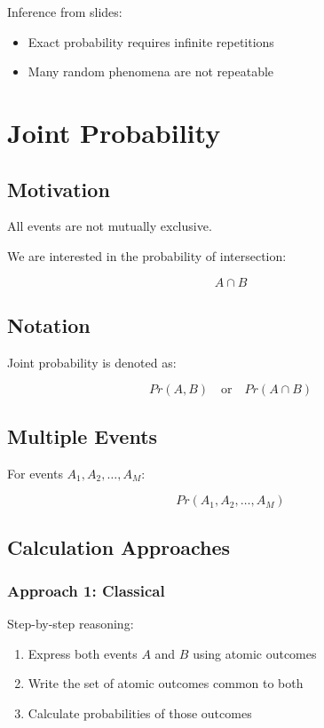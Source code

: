 \documentclass[12pt]{article}
\begin{document}
Inference from slides:

\begin{itemize}
    \item Exact probability requires infinite repetitions
    \item Many random phenomena are not repeatable
\end{itemize}

\section{Joint Probability}

\subsection{Motivation}

All events are not mutually exclusive.

We are interested in the probability of intersection:

\[
A \cap B
\]

\subsection{Notation}

Joint probability is denoted as:

\[
Pr(A,B) \quad \text{or} \quad Pr(A \cap B)
\]

\subsection{Multiple Events}

For events $A_1, A_2, \dots, A_M$:

\[
Pr(A_1, A_2, \dots, A_M)
\]

\subsection{Calculation Approaches}

\subsubsection*{Approach 1: Classical}

Step-by-step reasoning:

\begin{enumerate}
    \item Express both events $A$ and $B$ using atomic outcomes
    \item Write the set of atomic outcomes common to both
    \item Calculate probabilities of those outcomes
\end{enumerate}
\end{document}
